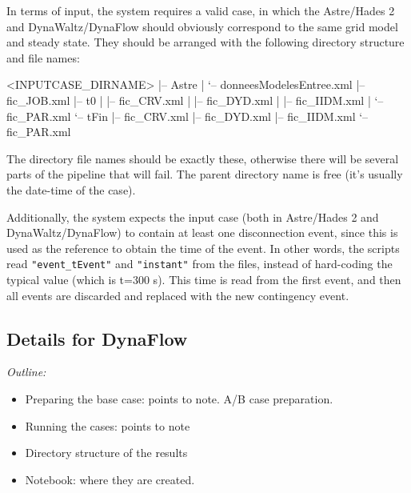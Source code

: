 \documentclass[conference]{IEEEtran}
\newcommand{\code}[1]{\texttt{#1}}
\begin{document}
In terms of input, the system requires a valid case, in which the Astre/Hades 2 and
DynaWaltz/DynaFlow should obviously correspond to the same grid model and steady state.
They should be arranged with the following directory structure and file names:
\begin{console}
  <INPUTCASE_DIRNAME>
  |-- Astre
  |   `-- donneesModelesEntree.xml
  |-- fic_JOB.xml
  |-- t0
  |   |-- fic_CRV.xml
  |   |-- fic_DYD.xml
  |   |-- fic_IIDM.xml
  |   `-- fic_PAR.xml
  `-- tFin
  |-- fic_CRV.xml
  |-- fic_DYD.xml
  |-- fic_IIDM.xml
  `-- fic_PAR.xml
\end{console}

The directory file names should be exactly these, otherwise there will be
several parts of the pipeline that will fail. The parent directory name is free
(it's usually the date-time of the case).

Additionally, the system expects the input case (both in Astre/Hades 2 and DynaWaltz/DynaFlow) to
contain at least one disconnection event, since this is used as the reference to
obtain the time of the event. In other words, the scripts read
\code{"event\_tEvent"} and \code{"instant"} from the files, instead of
hard-coding the typical value (which is t=300 s). This time is read from the
first event, and then all events are discarded and replaced with the new
contingency event.






\subsection{Details for DynaFlow}
\begin{center}
  \itshape
  Outline:
  \begin{itemize}
    \item Preparing the base case: points to note. A/B case preparation.
    \item Running the cases: points to note
    \item Directory structure of the results
    \item Notebook: where they are created.
  \end{itemize}
\end{center}
\end{document}
